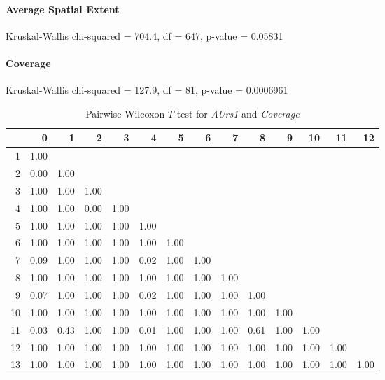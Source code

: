 \paragraph{Average Spatial Extent}
Kruskal-Wallis chi-squared = 704.4, df = 647, p-value = 0.05831

\paragraph{Coverage}
Kruskal-Wallis chi-squared = 127.9, df = 81, p-value = 0.0006961

\begin{table}[ht]
	\small
	\centering
	\begin{tabular}{rrrrrrrrrrrrrr}
		\hline
	   & 0 & 1 & 2 & 3 & 4 & 5 & 6 & 7 & 8 & 9 & 10 & 11 & 12 \\ 
		\hline
	  1 & 1.00 &  &  &  &  &  &  &  &  &  &  &  &  \\ 
		2 & 0.00 & 1.00 &  &  &  &  &  &  &  &  &  &  &  \\ 
		3 & 1.00 & 1.00 & 1.00 &  &  &  &  &  &  &  &  &  &  \\ 
		4 & 1.00 & 1.00 & 0.00 & 1.00 &  &  &  &  &  &  &  &  &  \\ 
		5 & 1.00 & 1.00 & 1.00 & 1.00 & 1.00 &  &  &  &  &  &  &  &  \\ 
		6 & 1.00 & 1.00 & 1.00 & 1.00 & 1.00 & 1.00 &  &  &  &  &  &  &  \\ 
		7 & 0.09 & 1.00 & 1.00 & 1.00 & 0.02 & 1.00 & 1.00 &  &  &  &  &  &  \\ 
		8 & 1.00 & 1.00 & 1.00 & 1.00 & 1.00 & 1.00 & 1.00 & 1.00 &  &  &  &  &  \\ 
		9 & 0.07 & 1.00 & 1.00 & 1.00 & 0.02 & 1.00 & 1.00 & 1.00 & 1.00 &  &  &  &  \\ 
		10 & 1.00 & 1.00 & 1.00 & 1.00 & 1.00 & 1.00 & 1.00 & 1.00 & 1.00 & 1.00 &  &  &  \\ 
		11 & 0.03 & 0.43 & 1.00 & 1.00 & 0.01 & 1.00 & 1.00 & 1.00 & 0.61 & 1.00 & 1.00 &  &  \\ 
		12 & 1.00 & 1.00 & 1.00 & 1.00 & 1.00 & 1.00 & 1.00 & 1.00 & 1.00 & 1.00 & 1.00 & 1.00 &  \\ 
		13 & 1.00 & 1.00 & 1.00 & 1.00 & 1.00 & 1.00 & 1.00 & 1.00 & 1.00 & 1.00 & 1.00 & 1.00 & 1.00 \\ 
		 \hline
	  \end{tabular}
    \caption{Pairwise Wilcoxon $T$-test for \textit{AUrs1} and \textit{Coverage}}
    \label{tbl:wilcoxon_baysis_effector_AUrs1_Cov}
\end{table}
